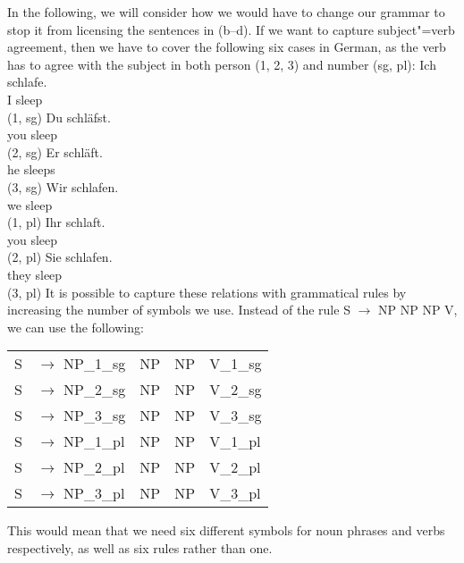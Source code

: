 In the following, we will consider how we would have to change our grammar to stop it from licensing the sentences in (b--d).
If we want to capture subject"=verb agreement, then we have to cover the following six cases in German, as the verb has to agree with the
subject in both person (1, 2, 3) and number (sg, pl):
\eal\jamwidth=8cm\relax%
\ex 
\gll Ich schlafe.\\
     I   sleep\\      \jam(1, sg)
\ex 
\gll Du schläfst.\\
     you sleep\\      \jam(2, sg)
\ex 
\gll Er schläft.\\
     he sleeps\\      \jam(3, sg)
\ex 
\gll Wir schlafen.\\
     we sleep\\       \jam(1, pl)
\ex 
\gll Ihr schlaft.\\
     you sleep\\       \jam(2, pl)
\ex 
\gll Sie schlafen.\\   
     they sleep\\      \jam(3, pl)
\zl
It is possible to capture these relations with grammatical rules by increasing 
the number of symbols we use. Instead of the rule S $\to$ NP NP NP V, we can use
the following:
\ea
\begin{tabular}[t]{@{}l@{ }l@{~~}l@{~~}l@{~~}l}
S  & $\to$ NP\_1\_sg & NP & NP & V\_1\_sg\\
S  & $\to$ NP\_2\_sg & NP & NP & V\_2\_sg\\
S  & $\to$ NP\_3\_sg & NP & NP & V\_3\_sg\\
S  & $\to$ NP\_1\_pl & NP & NP & V\_1\_pl\\
S  & $\to$ NP\_2\_pl & NP & NP & V\_2\_pl\\
S  & $\to$ NP\_3\_pl & NP & NP & V\_3\_pl\\
\end{tabular}
\z
This would mean that we need six different symbols for noun phrases and verbs respectively, as well as six rules rather than one.


